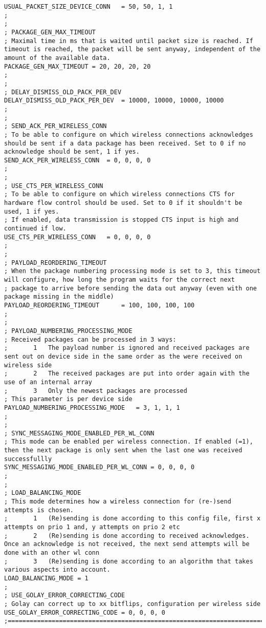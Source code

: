 \begin{lstlisting}
USUAL_PACKET_SIZE_DEVICE_CONN	= 50, 50, 1, 1
;
;
; PACKAGE_GEN_MAX_TIMEOUT
; Maximal time in ms that is waited until packet size is reached. If timeout is reached, the packet will be sent anyway, independent of the amount of the available data.
PACKAGE_GEN_MAX_TIMEOUT	= 20, 20, 20, 20
;
;
; DELAY_DISMISS_OLD_PACK_PER_DEV
DELAY_DISMISS_OLD_PACK_PER_DEV	= 10000, 10000, 10000, 10000
;
;
; SEND_ACK_PER_WIRELESS_CONN
; To be able to configure on which wireless connections acknowledges should be sent if a data package has been received. Set to 0 if no acknowledge should be sent, 1 if yes.
SEND_ACK_PER_WIRELESS_CONN	= 0, 0, 0, 0
;
;
; USE_CTS_PER_WIRELESS_CONN
; To be able to configure on which wireless connections CTS for hardware flow control should be used. Set to 0 if it shouldn't be used, 1 if yes.
; If enabled, data transmission is stopped CTS input is high and continued if low.
USE_CTS_PER_WIRELESS_CONN	= 0, 0, 0, 0
;
;
; PAYLOAD_REORDERING_TIMEOUT
; When the package numbering processing mode is set to 3, this timeout will configure, how long the program waits for the correct next
; package to arrive before sending the data out anyway (even with one package missing in the middle)
PAYLOAD_REORDERING_TIMEOUT		= 100, 100, 100, 100
;
;
; PAYLOAD_NUMBERING_PROCESSING_MODE
; Received packages can be processed in 3 ways:
; 		1	The payload number is ignored and received packages are sent out on device side in the same order as the were received on wireless side
;		2	The received packages are put into order again with the use of an internal array
;		3	Only the newest packages are processed
; This parameter is per device side
PAYLOAD_NUMBERING_PROCESSING_MODE	= 3, 1, 1, 1
;
;
; SYNC_MESSAGING_MODE_ENABLED_PER_WL_CONN
; This mode can be enabled per wireless connection. If enabled (=1), then the next package is only sent when the last one was received successfullly
SYNC_MESSAGING_MODE_ENABLED_PER_WL_CONN	= 0, 0, 0, 0
;
;
; LOAD_BALANCING_MODE
; This mode determines how a wireless connection for (re-)send attempts is chosen.
;		1	(Re)sending is done according to this config file, first x attempts on prio 1 and, y attempts on prio 2 etc
;		2	(Re)sending is done according to received acknowledges. Once an acknowledge is not received, the next send attempts will be done with an other wl conn
;		3	(Re)sending is done according to an algorithm that takes various aspects into account.
LOAD_BALANCING_MODE = 1
;
; USE_GOLAY_ERROR_CORRECTING_CODE
; Golay can correct up to xx bitflips, configuration per wireless side
USE_GOLAY_ERROR_CORRECTING_CODE = 0, 0, 0, 0
;=====================================================================================

\end{lstlisting}
